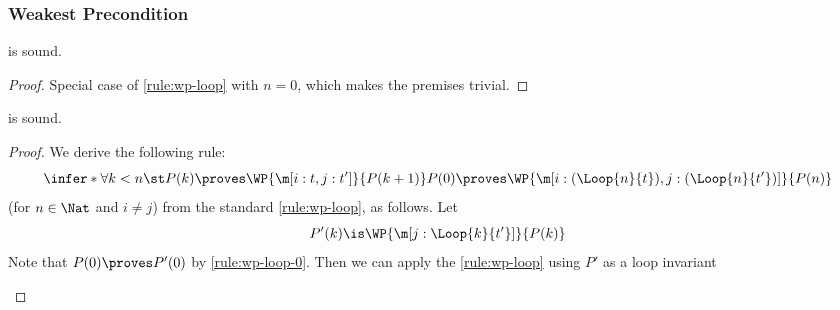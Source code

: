 \subsubsection{Weakest Precondition}
\begin{lemma}
\label{proof:wp-loop-0}
   is sound.
\end{lemma}

\begin{proof}
  Special case of \ref{rule:wp-loop} with $n=0$,
  which makes the premises trivial.
\end{proof} \begin{lemma}
\label{proof:wp-loop-lockstep}
   is sound.
\end{lemma}

\begin{proof}
  We derive the following rule:
  \[
  \infer*{
    \forall k < n\st
      P(k) \proves \WP {\m[i: t, j: t']}{P(k+1)}
  }{
    P(0) \proves
    \WP {\m[i: (\Loop{n}{t}), j: (\Loop{n}{t'})]} {P(n)}
  }
  \]
  (for $n\in \Nat$ and $i \ne j$)
  from the standard \ref{rule:wp-loop},
  as follows.
  Let
  \[
    P'(k) \is
    \WP {\m[j: \Loop{k}{t'}]} {P(k)}
  \]
  Note that
  $P(0) \proves P'(0)$
  by \ref{rule:wp-loop-0}.
  Then we can apply the \ref{rule:wp-loop} using $P'$ as a loop invariant
  \begin{derivation}
\end{derivation}
\end{proof}
